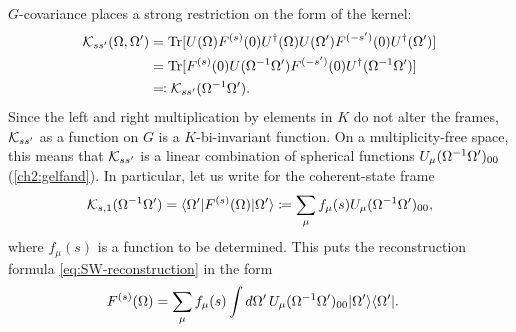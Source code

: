 $G$-covariance places a strong restriction on the form of the kernel:
\begin{align*}
	\mathcal{K}_{ss'}(\Omega,\Omega') &= \mathrm{Tr}[U(\Omega) F^{(s)}(0) U^{\dagger}(\Omega) U(\Omega') F^{(-s')}(0) U^{\dagger}(\Omega')] \\
	&= \mathrm{Tr}[ F^{(s)}(0) U(\Omega^{-1}\Omega') F^{(-s')}(0) U^{\dagger}(\Omega^{-1}\Omega')] \\
	&\eqqcolon \mathcal{K}_{ss'}(\Omega^{-1}\Omega').
\end{align*}
Since the left and right multiplication by elements in $K$ do not alter the frames, $\mathcal{K}_{ss'}$ as a function on $G$ is a $K$-bi-invariant function. On a multiplicity-free space, this means that $\mathcal{K}_{ss'}$ is a linear combination of spherical functions $U_{\mu}(\Omega^{-1}\Omega')_{00}$ (\autoref{ch2:gelfand}).
In particular, let us write for the coherent-state frame
\begin{align}\label{coherent-state-kernel}
	\rker{s,1}(\Omega^{-1}\Omega') 
	= \braket{\Omega'| F^{(s)} (\Omega) |\Omega'}  
	\coloneqq \sum_{\mu} f_{\mu}(s) \rep_{\mu}(\Omega^{-1}\Omega')_{00},
\end{align}
where $f_{\mu}(s)$ is a function to be determined. This puts the reconstruction formula \eqref{eq:SW-reconstruction} in the form
\begin{align}\label{thm:pre-frame-formula}
F^{(s)} (\Omega) &= \sum_{\mu} f_{\mu}(s) \int d\Omega'\,\rep_{\mu}(\Omega^{-1}\Omega')_{00} \ketbra{\Omega'}{\Omega'}.
\end{align}

